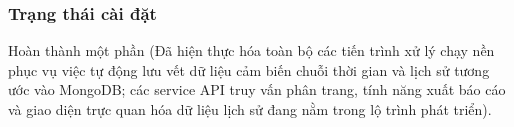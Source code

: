 




\subsubsection{Trạng thái cài đặt}
Hoàn thành một phần (Đã hiện thực hóa toàn bộ các tiến trình xử lý chạy nền phục vụ việc tự động lưu vết dữ liệu cảm biến chuỗi thời gian và lịch sử tương ước vào MongoDB; các service API truy vấn phân trang, tính năng xuất báo cáo và giao diện trực quan hóa dữ liệu lịch sử đang nằm trong lộ trình phát triển).

